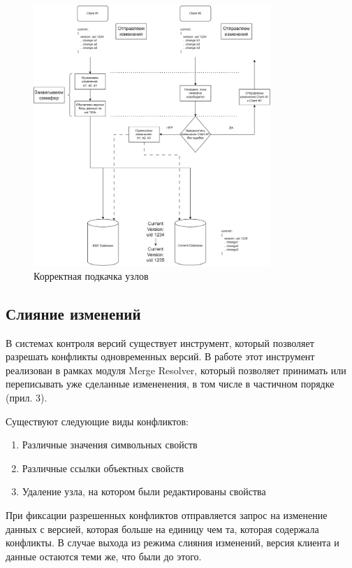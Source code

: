 \documentclass[12pt]{article}
\begin{document}
\begin{figure}[!ht]
    \centering
    \includegraphics[width=0.8\textwidth]{_images/concurrent_push_good.png}
    \caption{Корректная подкачка узлов}
\end{figure}

\pagebreak

\subsection{Слияние изменений}
\qquad В системах контроля версий существует инструмент, который позволяет разрешать конфликты одновременных версий. В работе этот инструмент реализован в рамках модуля Merge Resolver, который позволяет принимать или переписывать уже сделанные измененения, в том числе в частичном порядке (прил. 3).

Существуют следующие виды конфликтов:

\begin{enumerate}
    \item Различные значения символьных свойств
    \item Различные ссылки объектных свойств
    \item Удаление узла, на котором были редактированы свойства
\end{enumerate}

При фиксации разрешенных конфликтов отправляется запрос на изменение данных с версией, которая больше на единицу чем та, которая содержала конфликты. В случае выхода из режима слияния изменений, версия клиента и данные остаются теми же, что были до этого.
\end{document}
